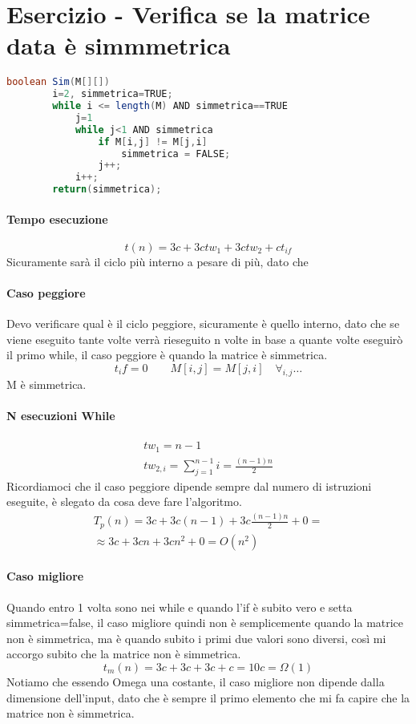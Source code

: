 \section{Esercizio - Verifica se la matrice data è simmmetrica}
\begin{lstlisting}[language=Java] 
    boolean Sim(M[][])
        i=2, simmetrica=TRUE;
        while i <= length(M) AND simmetrica==TRUE
            j=1
            while j<1 AND simmetrica
                if M[i,j] != M[j,i]
                    simmetrica = FALSE;
                j++;
            i++;
        return(simmetrica);
\end{lstlisting}
\paragraph*{Tempo esecuzione}
\begin{equation}
    t(n) = 3c + 3ctw_1 + 3ctw_2 + ct_{if}
\end{equation}
Sicuramente sarà il ciclo più interno a pesare di più, dato che 
\paragraph*{Caso peggiore}
Devo verificare qual è il ciclo peggiore, sicuramente è quello interno,
dato che se viene eseguito tante volte verrà rieseguito n volte in base a quante volte
eseguirò il primo while, il caso peggiore è quando la matrice è simmetrica.
\begin{equation}
    t_if = 0 \qquad M[i,j] = M[j,i] \quad \forall_{i,j} \dots
\end{equation}
M è simmetrica.\\
\paragraph*{N esecuzioni While}
\begin{align}
    tw_1 = n-1\\
    tw_{2,i} = \sum_{j=1}^{n-1} i = \frac{(n-1)n}{2}
\end{align}
Ricordiamoci che il caso peggiore dipende sempre dal numero di istruzioni eseguite, è slegato da
cosa deve fare l'algoritmo.
\begin{align}
    T_p(n) = 3c + 3c(n-1) +3c \frac{(n-1)n}{2}+0=\\
    \approx 3c + 3cn +3cn^2 + 0 = O(n^2)
\end{align}
\paragraph*{Caso migliore}
Quando entro 1 volta sono nei while e quando l'if è subito vero e setta simmetrica=false,
il caso migliore quindi non è semplicemente quando la matrice non è simmetrica, ma è quando
subito i primi due valori sono diversi, così mi accorgo subito che la matrice non è simmetrica.
\begin{equation*}
    t_m(n) = 3c+3c+3c+c = 10c = \Omega(1)
\end{equation*}
Notiamo che essendo Omega una costante, il caso migliore non dipende dalla dimensione
dell'input, dato che è sempre il primo elemento che mi fa capire che la matrice non è simmetrica.
